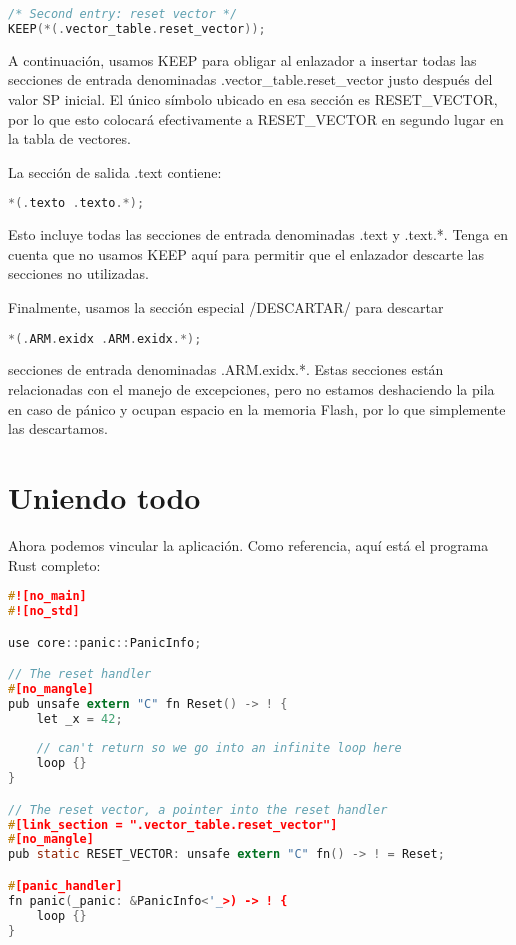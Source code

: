 \begin{lstlisting}[language=c]
/* Second entry: reset vector */
KEEP(*(.vector_table.reset_vector));
\end{lstlisting}


A continuación, usamos KEEP para obligar al enlazador a insertar todas las secciones de entrada denominadas .vector\_table.reset\_vector justo después del valor SP inicial. El único símbolo ubicado en esa sección es RESET\_VECTOR, por lo que esto colocará efectivamente a RESET\_VECTOR en segundo lugar en la tabla de vectores.

La sección de salida .text contiene:

\begin{lstlisting}[language=c]
*(.texto .texto.*);
\end{lstlisting}

Esto incluye todas las secciones de entrada denominadas .text y .text.*. Tenga en cuenta que no usamos KEEP aquí para permitir que el enlazador descarte las secciones no utilizadas.

Finalmente, usamos la sección especial /DESCARTAR/ para descartar

\begin{lstlisting}[language=c]
*(.ARM.exidx .ARM.exidx.*);
\end{lstlisting}

secciones de entrada denominadas .ARM.exidx.*. Estas secciones están relacionadas con el manejo de excepciones, pero no estamos deshaciendo la pila en caso de pánico y ocupan espacio en la memoria Flash, por lo que simplemente las descartamos.

\section{Uniendo todo}

Ahora podemos vincular la aplicación. Como referencia, aquí está el programa Rust completo:

\begin{lstlisting}[language=c]
#![no_main]
#![no_std]

use core::panic::PanicInfo;

// The reset handler
#[no_mangle]
pub unsafe extern "C" fn Reset() -> ! {
	let _x = 42;
	
	// can't return so we go into an infinite loop here
	loop {}
}

// The reset vector, a pointer into the reset handler
#[link_section = ".vector_table.reset_vector"]
#[no_mangle]
pub static RESET_VECTOR: unsafe extern "C" fn() -> ! = Reset;

#[panic_handler]
fn panic(_panic: &PanicInfo<'_>) -> ! {
	loop {}
}
\end{lstlisting}


